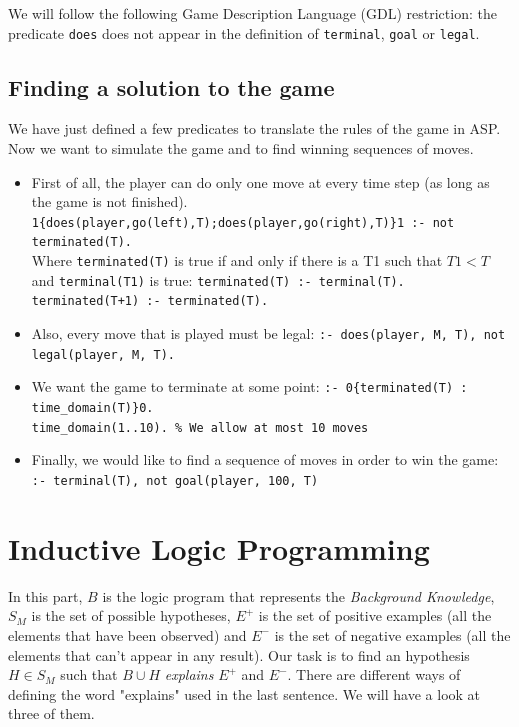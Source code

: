 We will follow the following Game Description Language (GDL) restriction: the predicate \texttt{does} does not appear in the definition of \texttt{terminal}, \texttt{goal} or \texttt{legal}.

\subsection{Finding a solution to the game}

We have just defined a few predicates to translate the rules of the game in ASP. Now we want to simulate the game and to find winning sequences of moves.
\begin{itemize}
\item First of all, the player can do only one move at every time step (as long as the game is not finished).\newline
\texttt{1\{does(player,go(left),T);does(player,go(right),T)\}1 :- not terminated(T).}\\
Where \texttt{terminated(T)} is true if and only if there is a T1 such that $T1<T$ and \texttt{terminal(T1)} is true:\newline
\texttt{terminated(T) :- terminal(T).}  \\
\texttt{terminated(T+1) :- terminated(T).}

\item Also, every move that is played must be legal:\newline
\texttt{:- does(player, M, T), not legal(player, M, T).}

\item We want the game to terminate at some point:\newline
\texttt{:- 0\{terminated(T) : time\_domain(T)\}0.}\\
\texttt{time\_domain(1..10). \% We allow at most 10 moves} 

\item Finally, we would like to find a sequence of moves in order to win the game:\newline
\texttt{:- terminal(T), not goal(player, 100, T)}

\end{itemize}

\section{Inductive Logic Programming}

In this part, $B$ is the logic program that represents the \textit{Background Knowledge}, $S_M$ is the set of possible hypotheses, $E^+$ is the set of positive examples (all the elements that have been observed) and $E^-$ is the set of negative examples (all the elements that can't appear in any result). Our task is to find an hypothesis $H\in S_M$ such that $B\cup H$ \textit{explains} $E^+$ and $E^-$. There are different ways of defining the word "explains" used in the last sentence. We will have a look at three of them.

